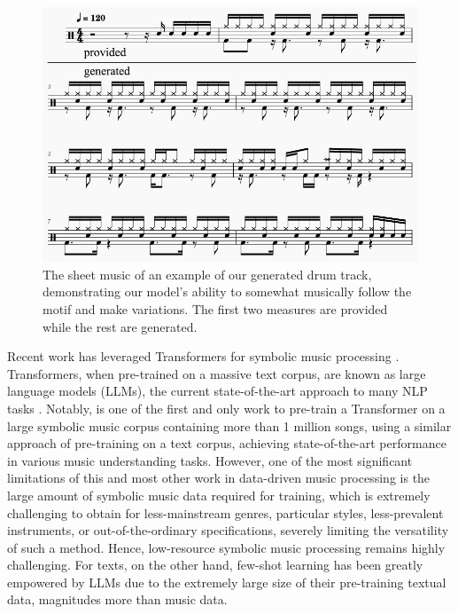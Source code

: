 \documentclass[letterpaper]{article} %
\begin{document}
\begin{figure}[t!]
    \centering
    \includegraphics[scale=0.37]{images/example.png}
    \caption{The sheet music of an example of our generated drum track, demonstrating our model's ability to somewhat musically follow the motif and make variations. The first two measures are provided while the rest are generated.}
    \label{fig:example}
\end{figure}

Recent work has leveraged Transformers \cite{NIPS2017_3f5ee243} for symbolic music processing \citep{huang2018music,https://doi.org/10.48550/arxiv.2210.10349}. Transformers, when pre-trained on a massive text corpus, are known as large language models (LLMs), the current state-of-the-art approach to many NLP tasks \cite{devlin-etal-2019-bert,NEURIPS2020_1457c0d6}. Notably, \citet{zeng2021musicbert} is one of the first and only work to pre-train a Transformer on a large symbolic music corpus containing more than 1 million songs, using a similar approach of pre-training on a text corpus, achieving state-of-the-art performance in various music understanding tasks. However, one of the most significant limitations of this and most other work in data-driven music processing is the large amount of symbolic music data required for training, which is extremely challenging to obtain for less-mainstream genres, particular styles, less-prevalent instruments, or out-of-the-ordinary specifications, severely limiting the versatility of such a method. Hence, low-resource symbolic music processing remains highly challenging. For texts, on the other hand, few-shot learning has been greatly empowered by LLMs due to the extremely large size of their pre-training textual data, magnitudes more than music data.
\end{document}
